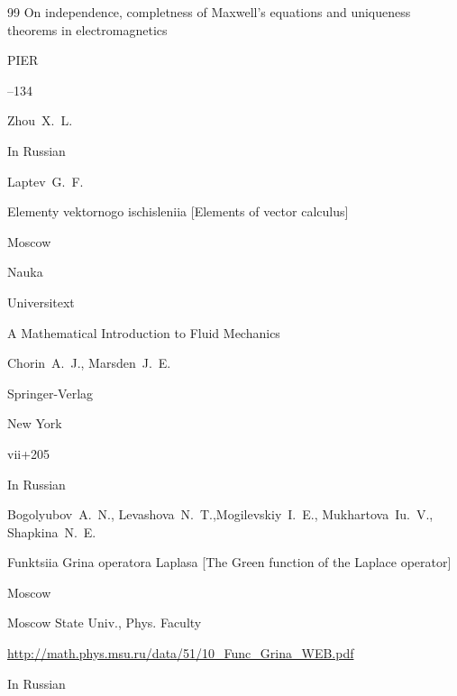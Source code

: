\begin{thebibliography}{99}
\paper On independence, completness of Maxwell's equations and uniqueness theorems in electromagnetics 

\jour PIER



--134

\by Zhou~X.~L. 




\lang In Russian

\by Laptev~G.~F.

\book Elementy vektornogo ischisleniia \rm [Elements of vector calculus]

\publaddr Moscow

\publ Nauka








\serial Universitext


\book A Mathematical Introduction to Fluid Mechanics

\by  Chorin~A.~J.,  Marsden~J.~E. 

\publ Springer-Verlag 

\publaddr New York

\totalpages vii+205





\lang In Russian

\by Bogolyubov~A.~N., Levashova~N.~T.,Mogilevskiy~I.~E., Mukhartova~Iu.~V., Shapkina~N.~E.

\book Funktsiia Grina operatora Laplasa \rm [The Green function of the Laplace operator]

\publaddr Moscow

\publ Moscow State Univ., Phys. Faculty



\url{http://math.phys.msu.ru/data/51/10_Func_Grina_WEB.pdf} 






\lang In Russian


\end{thebibliography}
